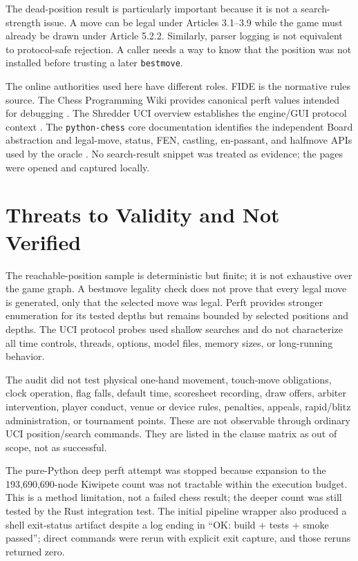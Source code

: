 \documentclass[conference]{IEEEtran}
\begin{document}
The dead-position result is particularly important because it is not a search-strength issue. A move can be legal under Articles 3.1--3.9 while the game must already be drawn under Article 5.2.2. Similarly, parser logging is not equivalent to protocol-safe rejection. A caller needs a way to know that the position was not installed before trusting a later \texttt{bestmove}.

The online authorities used here have different roles. FIDE is the normative rules source. The Chess Programming Wiki provides canonical perft values intended for debugging \cite{perft}. The Shredder UCI overview establishes the engine/GUI protocol context \cite{uci}. The \texttt{python-chess} core documentation identifies the independent Board abstraction and legal-move, status, FEN, castling, en-passant, and halfmove APIs used by the oracle \cite{pychess}. No search-result snippet was treated as evidence; the pages were opened and captured locally.

\section{Threats to Validity and Not Verified}
The reachable-position sample is deterministic but finite; it is not exhaustive over the game graph. A bestmove legality check does not prove that every legal move is generated, only that the selected move was legal. Perft provides stronger enumeration for its tested depths but remains bounded by selected positions and depths. The UCI protocol probes used shallow searches and do not characterize all time controls, threads, options, model files, memory sizes, or long-running behavior.

The audit did not test physical one-hand movement, touch-move obligations, clock operation, flag falls, default time, scoresheet recording, draw offers, arbiter intervention, player conduct, venue or device rules, penalties, appeals, rapid/blitz administration, or tournament points. These are not observable through ordinary UCI position/search commands. They are listed in the clause matrix as out of scope, not as successful.

The pure-Python deep perft attempt was stopped because expansion to the 193,690,690-node Kiwipete count was not tractable within the execution budget. This is a method limitation, not a failed chess result; the deeper count was still tested by the Rust integration test. The initial pipeline wrapper also produced a shell exit-status artifact despite a log ending in ``OK: build + tests + smoke passed''; direct commands were rerun with explicit exit capture, and those reruns returned zero.
\end{document}
